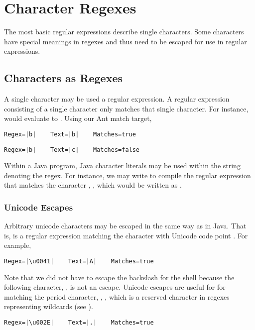 \section{Character Regexes}

The most basic regular expressions describe single characters.  Some
characters have special meanings in regexes and thus need to be
escaped for use in regular expressions.

\subsection{Characters as Regexes}

A single character may be used a regular expression.  A regular
expression consisting of a single character only matches that single
character.  For instance,
 would evaluate to
.  Using our Ant match target, 
%
\begin{verbatim}
Regex=|b|    Text=|b|    Matches=true
\end{verbatim}
%
\begin{verbatim}
Regex=|b|    Text=|c|    Matches=false
\end{verbatim}
%
Within a Java program, Java character literals may be used within the
string denoting the regex.  For instance, we may write
 to compile the regular expression
that matches the character , , which would be written as .

\subsubsection{Unicode Escapes}

Arbitrary unicode characters may be escaped in the same way as in
Java.  That is,  is a regular expression
matching the character with Unicode code point
.  For example,
%
%
\begin{verbatim}
Regex=|\u0041|    Text=|A|    Matches=true
\end{verbatim}
%
Note that we did not have to escape the backslash for the shell
because the following character, , is not an escape.  Unicode
escapes are useful for for matching the period character,
, , which is a reserved character
in regexes representing wildcards (see ).
%
%
\begin{verbatim}
Regex=|\u002E|    Text=|.|    Matches=true
\end{verbatim}
%

